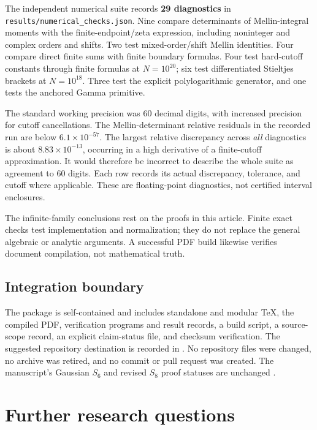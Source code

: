 \documentclass[11pt,letterpaper]{article}
\numberwithin{equation}{section}
\theoremstyle{definition}\newtheorem{definition}[theorem]{Definition}
\theoremstyle{remark}\newtheorem{remark}[theorem]{Remark}
\begin{document}
The independent numerical suite records \textbf{29 diagnostics} in
\texttt{results/numerical\_checks.json}. Nine compare determinants of
Mellin-integral moments with the finite-endpoint/zeta expression, including
noninteger and complex orders and shifts. Two test mixed-order/shift
Mellin identities. Four compare direct finite sums with finite boundary
formulas. Four test hard-cutoff constants through finite formulas at
$N=10^{20}$; six test differentiated Stieltjes brackets at $N=10^{18}$.
Three test the explicit polylogarithmic generator, and one tests the
anchored Gamma primitive.

The standard working precision was 60 decimal digits, with increased
precision for cutoff cancellations. The Mellin-determinant relative
residuals in the recorded run are below $6.1\times10^{-57}$.
The largest relative discrepancy across \emph{all} diagnostics is about
$8.83\times10^{-13}$, occurring in a high derivative of a finite-cutoff
approximation. It would therefore be incorrect to describe the whole
suite as agreement to 60 digits. Each row records its actual discrepancy,
tolerance, and cutoff where applicable. These are floating-point
diagnostics, not certified interval enclosures.

The infinite-family conclusions rest on the proofs in this article.
Finite exact checks test implementation and normalization; they do not
replace the general algebraic or analytic arguments. A successful PDF
build likewise verifies document compilation, not mathematical truth.

\subsection{Integration boundary}
The package is self-contained and includes standalone and modular TeX,
the compiled PDF, verification programs and result records, a build
script, a source-scope record, an explicit claim-status file, and checksum
verification. The suggested repository destination is recorded in
. No repository files were changed,
no archive was retired, and no commit or pull request was created.
The manuscript's Gaussian $S_6$ and revised $S_8$ proof statuses are
unchanged \cite{repo:discovery}.

\section{Further research questions}
\label{sec:questions}
\end{document}
